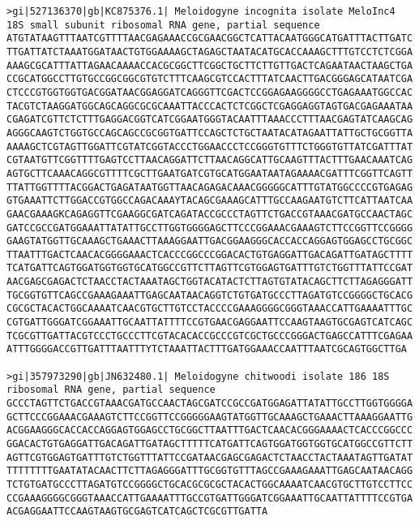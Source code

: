 \documentclass[11pt]{article}
\begin{document}
\begin{Verbatim}[commandchars=\\\{\}]
>gi|527136370|gb|KC875376.1| Meloidogyne incognita isolate MeloInc4 18S small subunit ribosomal RNA gene, partial sequence
ATGTATAAGTTTAATCGTTTTAACGAGAAACCGCGAACGGCTCATTACAATGGGCATGATTTACTTGATC
TTGATTATCTAAATGGATAACTGTGGAAAAGCTAGAGCTAATACATGCACCAAAGCTTTGTCCTCTCGGA
AAAGCGCATTTATTAGAACAAAACCACGCGGCTTCGGCTGCTTCTTGTTGACTCAGAATAACTAAGCTGA
CCGCATGGCCTTGTGCCGGCGGCGTGTCTTTCAAGCGTCCACTTTATCAACTTGACGGGAGCATAATCGA
CTCCCGTGGTGGTGACGGATAACGGAGGATCAGGGTTCGACTCCGGAGAAGGGGCCTGAGAAATGGCCAC
TACGTCTAAGGATGGCAGCAGGCGCGCAAATTACCCACTCTCGGCTCGAGGAGGTAGTGACGAGAAATAA
CGAGATCGTTCTCTTTGAGGACGGTCATCGGAATGGGTACAATTTAAACCCTTTAACGAGTATCAAGCAG
AGGGCAAGTCTGGTGCCAGCAGCCGCGGTGATTCCAGCTCTGCTAATACATAGAATTATTGCTGCGGTTA
AAAAGCTCGTAGTTGGATTCGTATCGGTACCCTGGAACCCTCCGGGTGTTTCTGGGTGTTATCGATTTAT
CGTAATGTTCGGTTTTGAGTCCTTAACAGGATTCTTAACAGGCATTGCAAGTTTACTTTGAACAAATCAG
AGTGCTTCAAACAGGCGTTTTCGCTTGAATGATCGTGCATGGAATAATAGAAAACGATTTCGGTTCAGTT
TTATTGGTTTTACGGACTGAGATAATGGTTAACAGAGACAAACGGGGGCATTTGTATGGCCCCGTGAGAG
GTGAAATTCTTGGACCGTGGCCAGACAAAYTACAGCGAAAGCATTTGCCAAGAATGTCTTCATTAATCAA
GAACGAAAGKCAGAGGTTCGAAGGCGATCAGATACCGCCCTAGTTCTGACCGTAAACGATGCCAACTAGC
GATCCGCCGATGGAAATTATATTGCCTTGGTGGGGAGCTTCCCGGAAACGAAAGTCTTCCGGTTCCGGGG
GAAGTATGGTTGCAAAGCTGAAACTTAAAGGAATTGACGGAAGGGCACCACCAGGAGTGGAGCCTGCGGC
TTAATTTGACTCAACACGGGGAAACTCACCCGGCCCGGACACTGTGAGGATTGACAGATTGATAGCTTTT
TCATGATTCAGTGGATGGTGGTGCATGGCCGTTCTTAGTTCGTGGAGTGATTTGTCTGGTTTATTCCGAT
AACGAGCGAGACTCTAACCTACTAAATAGCTGGTACATACTCTTAGTGTATACAGCTTCTTAGAGGGATT
TGCGGTGTTCAGCCGAAAGAAATTGAGCAATAACAGGTCTGTGATGCCCTTAGATGTCCGGGGCTGCACG
CGCGCTACACTGGCAAAATCAACGTGCTTGTCCTACCCCGAAAGGGGCGGGTAAACCATTGAAAATTTGC
CGTGATTGGGATCGGAAATTGCAATTATTTTCCGTGAACGAGGAATTCCAAGTAAGTGCGAGTCATCAGC
TCGCGTTGATTACGTCCCTGCCCTTCGTACACACCGCCCGTCGCTGCCCGGGACTGAGCCATTTCGAGAA
ATTTGGGGACCGTTGATTTAATTTYTCTAAATTACTTTGATGGAAACCAATTTAATCGCAGTGGCTTGA

>gi|357973290|gb|JN632480.1| Meloidogyne chitwoodi isolate 186 18S ribosomal RNA gene, partial sequence
GCCCTAGTTCTGACCGTAAACGATGCCAACTAGCGATCCGCCGATGGAGATTATATTGCCTTGGTGGGGA
GCTTCCCGGAAACGAAAGTCTTCCGGTTCCGGGGGAAGTATGGTTGCAAAGCTGAAACTTAAAGGAATTG
ACGGAAGGGCACCACCAGGAGTGGAGCCTGCGGCTTAATTTGACTCAACACGGGAAAACTCACCCGGCCC
GGACACTGTGAGGATTGACAGATTGATAGCTTTTTCATGATTCAGTGGATGGTGGTGCATGGCCGTTCTT
AGTTCGTGGAGTGATTTGTCTGGTTTATTCCGATAACGAGCGAGACTCTAACCTACTAAATAGTTGATAT
TTTTTTTTGAATATACAACTTCTTAGAGGGATTTGCGGTGTTTAGCCGAAAGAAATTGAGCAATAACAGG
TCTGTGATGCCCTTAGATGTCCGGGGCTGCACGCGCGCTACACTGGCAAAATCAACGTGCTTGTCCTTCC
CCGAAAGGGGCGGGTAAACCATTGAAAATTTGCCGTGATTGGGATCGGAAATTGCAATTATTTTCCGTGA
ACGAGGAATTCCAAGTAAGTGCGAGTCATCAGCTCGCGTTGATTA


\end{Verbatim}
\end{document}
